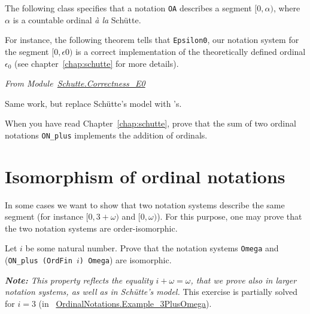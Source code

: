 The following class specifies that a notation \texttt{OA} describes a segment $[0,\alpha)$,
where $\alpha$ is a countable ordinal \emph{à la}  Schütte.


\label{types:ON-for}




For instance, the following theorem tells that \texttt{Epsilon0}, our notation system for the segment $[0,\epsilon0)$ is a correct implementation of the theoretically defined  ordinal $\epsilon_0$
(see chapter~\ref{chap:schutte} for more details).

\vspace{4pt}
\noindent\emph{From Module~\href{../theories/html/hydras.Schutte.Correctness_E0.html}{Schutte.Correctness\_E0}}






\begin{project}
Same work, but replace Schütte's model with \gaia's.
\end{project}

\begin{project}
  When you have read Chapter~\ref{chap:schutte}, prove that the sum of two ordinal notations \texttt{ON\_plus} implements the addition of ordinals.
\end{project}





\section{Isomorphism of ordinal notations}


In some cases we want to show that two notation systems describe the same segment (for instance $[0,3+\omega)$ and $[0,\omega)$\;). For this purpose, one may prove that the two notation systems are order-isomorphic.


\label{types:ON-iso} 






\begin{exercise}
\label{exo:i-plus-omega}
Let $i$ be some natural number. Prove that the notation systems 
\texttt{Omega} and (\texttt{ON\_plus (OrdFin $i$) Omega}) are isomorphic.

{\it \textbf{Note:} This property reflects the equality $i+\omega=\omega$, that we prove also in larger notation systems, as well as in Schütte's model.}
This exercise is partially solved for $i=3$ (in ~\href{../theories/html/hydras.OrdinalNotations.Example_3PlusOmega.html}{OrdinalNotations.Example\_3PlusOmega}).

\end{exercise}

